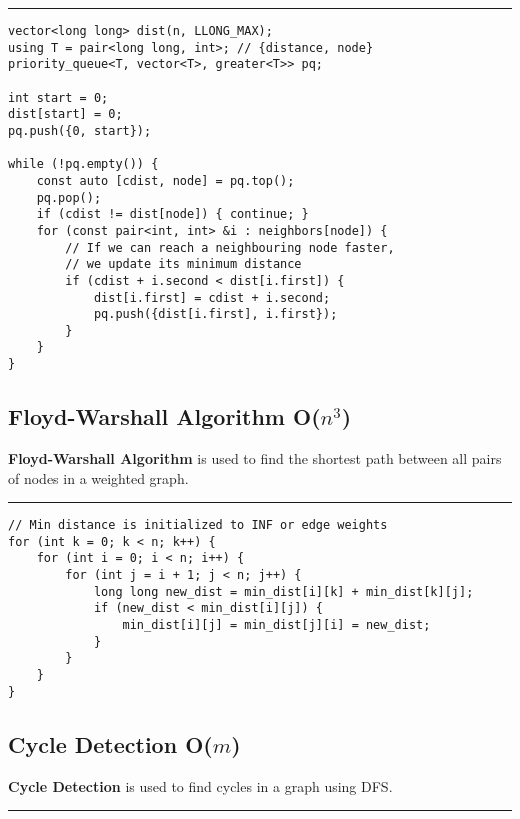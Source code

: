 \documentclass{article}
\begin{document}
\noindent\rule{\textwidth}{1pt}

\begin{verbatim}
vector<long long> dist(n, LLONG_MAX);
using T = pair<long long, int>; // {distance, node}
priority_queue<T, vector<T>, greater<T>> pq;

int start = 0;
dist[start] = 0;
pq.push({0, start});

while (!pq.empty()) {
    const auto [cdist, node] = pq.top();
    pq.pop();
    if (cdist != dist[node]) { continue; }
    for (const pair<int, int> &i : neighbors[node]) {
        // If we can reach a neighbouring node faster,
        // we update its minimum distance
        if (cdist + i.second < dist[i.first]) {
            dist[i.first] = cdist + i.second;
            pq.push({dist[i.first], i.first});
        }
    }
}
\end{verbatim}



\subsection{Floyd-Warshall Algorithm O($n^3$)}

\textbf{Floyd-Warshall Algorithm} is used to find the shortest path between all pairs of nodes in a weighted graph.

\noindent\rule{\textwidth}{1pt}

\begin{verbatim}
// Min distance is initialized to INF or edge weights
for (int k = 0; k < n; k++) {
    for (int i = 0; i < n; i++) {
        for (int j = i + 1; j < n; j++) {
            long long new_dist = min_dist[i][k] + min_dist[k][j];
            if (new_dist < min_dist[i][j]) {
                min_dist[i][j] = min_dist[j][i] = new_dist;
            }
        }
    }
}
\end{verbatim}

\pagebreak

\subsection{Cycle Detection O($m$)}

\textbf{Cycle Detection} is used to find cycles in a graph using DFS. 

\noindent\rule{\textwidth}{1pt}
\end{document}
